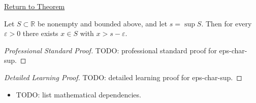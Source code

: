 \newpage
{}
\label{prf:eps-char-sup}

\begin{remark*}[Return]
\hyperref[prop:eps-char-sup]{Return to Theorem}
\end{remark*}

\begin{theorem*}[$$-characterisation of $$]
Let $S\subset\mathbb{R}$ be nonempty and bounded above, and let
$s=\sup S$. Then for every $\varepsilon>0$ there exists $x\in S$ with
$x>s-\varepsilon$.
\end{theorem*}

\begin{proof}[Professional Standard Proof]
\LRAProofBodyStart
TODO: professional standard proof for eps-char-sup.
\end{proof}

\begin{proof}[Detailed Learning Proof]
\LRAProofBodyStart
TODO: detailed learning proof for eps-char-sup.
\end{proof}

\begin{remark*}
\end{remark*}

\begin{dependencies}
\begin{itemize}
  \item TODO: list mathematical dependencies.
\end{itemize}
\end{dependencies}

\clearpage
